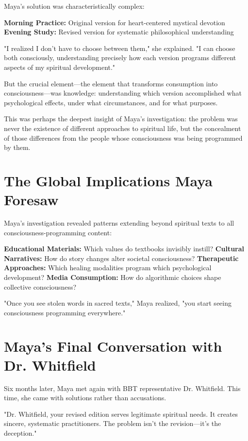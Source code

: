 \documentclass[11pt,twoside]{book}
\begin{document}
Maya's solution was characteristically complex:

\textbf{\textbf{Morning Practice:}} Original version for heart-centered mystical devotion
\textbf{\textbf{Evening Study:}} Revised version for systematic philosophical understanding

"I realized I don't have to choose between them," she explained. "I can choose both consciously, understanding precisely how each version programs different aspects of my spiritual development."

But the crucial element—the element that transforms consumption into consciousness—was knowledge: understanding which version accomplished what psychological effects, under what circumstances, and for what purposes.

This was perhaps the deepest insight of Maya's investigation: the problem was never the existence of different approaches to spiritual life, but the concealment of those differences from the people whose consciousness was being programmed by them.
\section*{The Global Implications Maya Foresaw}
\label{sec:org972f31f}

Maya's investigation revealed patterns extending beyond spiritual texts to all consciousness-programming content:

\textbf{\textbf{Educational Materials:}} Which values do textbooks invisibly instill?
\textbf{\textbf{Cultural Narratives:}} How do story changes alter societal consciousness?
\textbf{\textbf{Therapeutic Approaches:}} Which healing modalities program which psychological development?
\textbf{\textbf{Media Consumption:}} How do algorithmic choices shape collective consciousness?

"Once you see stolen words in sacred texts," Maya realized, "you start seeing consciousness programming everywhere."
\section*{Maya's Final Conversation with Dr. Whitfield}
\label{sec:org57d89c6}

Six months later, Maya met again with BBT representative Dr. Whitfield. This time, she came with solutions rather than accusations.

"Dr. Whitfield, your revised edition serves legitimate spiritual needs. It creates sincere, systematic practitioners. The problem isn't the revision—it's the deception."
\end{document}
